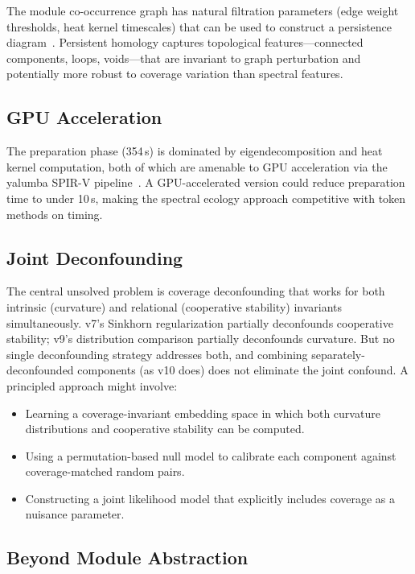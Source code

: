 \documentclass{../yalumba}
\begin{document}
The module co-occurrence graph has natural filtration parameters
(edge weight thresholds, heat kernel timescales) that can be used to
construct a persistence diagram~\cite{edelsbrunner2010computational,
kerber2017geometry}.  Persistent homology captures topological
features---connected components, loops, voids---that are invariant
to graph perturbation and potentially more robust to coverage variation
than spectral features.

\subsection{GPU Acceleration}

The preparation phase (354\,s) is dominated by eigendecomposition and
heat kernel computation, both of which are amenable to GPU acceleration
via the yalumba SPIR-V pipeline~\cite{chung1997spectral}.  A
GPU-accelerated version could reduce preparation time to under 10\,s,
making the spectral ecology approach competitive with token methods
on timing.

\subsection{Joint Deconfounding}

The central unsolved problem is coverage deconfounding that works
for both intrinsic (curvature) and relational (cooperative stability)
invariants simultaneously.  v7's Sinkhorn regularization partially
deconfounds cooperative stability; v9's distribution comparison
partially deconfounds curvature.  But no single deconfounding strategy
addresses both, and combining separately-deconfounded components (as
v10 does) does not eliminate the joint confound.  A principled approach
might involve:

\begin{itemize}
\item Learning a coverage-invariant embedding space in which both
  curvature distributions and cooperative stability can be computed.
\item Using a permutation-based null model to calibrate each
  component against coverage-matched random pairs.
\item Constructing a joint likelihood model that explicitly
  includes coverage as a nuisance parameter.
\end{itemize}

\subsection{Beyond Module Abstraction}
\end{document}
